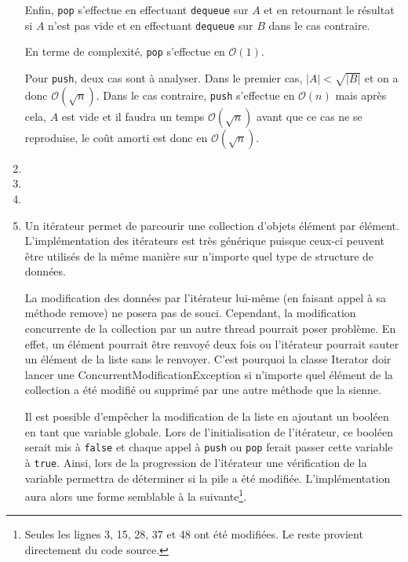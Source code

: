 \begin{enumerate}
	Enfin, \lstinline{pop}\lstinline{} s'effectue en
	effectuant \lstinline{dequeue}\lstinline{} sur $A$
	et en retournant le résultat si $A$ n'est pas vide
	et en effectuant \lstinline{dequeue}\lstinline{}
	sur $B$ dans le cas contraire.
	
	En terme de complexité,
	\lstinline{pop}\lstinline{} s'effectue en
	$\mathcal{O}(1)$.
	
	Pour \lstinline{push}\lstinline{}, deux cas sont
	à analyser. Dans le premier cas,
	$|A| < \sqrt{|B|}$ et on a donc
	$\mathcal{O}(\sqrt{n})$. Dans le cas contraire,
	\lstinline{push}\lstinline{} s'effectue en
	$\mathcal{O}(n)$ mais après cela, $A$ est vide et
	il faudra un temps $\mathcal{O}(\sqrt{n})$ avant
	que ce cas ne se reproduise, le coût amorti est
	donc en $\mathcal{O}(\sqrt{n})$.
	\item
	\item
	\item
	\item Un itérateur permet de parcourir une collection
        d'objets élément par élément. L'implémentation des
        itérateurs est très générique puisque ceux-ci peuvent
        être utilisés de la même manière sur n'importe quel
        type de structure de données.
	
	La modification des données par l'itérateur lui-même
        (en faisant appel à sa méthode remove) ne posera pas
        de souci. Cependant, la modification concurrente de
        la collection par un autre thread pourrait poser problème.
        En effet, un élément pourrait être renvoyé deux fois ou
        l'itérateur pourrait sauter un élément de la liste sans
        le renvoyer. C'est pourquoi la classe Iterator doir lancer
        une ConcurrentModificationException si n'importe quel élément
        de la collection a été modifié ou supprimé par une autre
        méthode que la sienne.\cite{iter-openclass}
	 
	Il est possible d'empêcher la modification de la liste en
        ajoutant un booléen en tant que variable globale. Lors de
        l'initialisation de l'itérateur, ce booléen serait mis à
        \lstinline{false}\lstinline{} et chaque appel à
        \lstinline{push}\lstinline{} ou \lstinline{pop}\lstinline{}
        ferait passer cette variable à \lstinline{true}\lstinline{}.
        Ainsi, lors de la progression de l'itérateur une vérification
        de la variable permettra de déterminer si la pile a été modifiée.
        L'implémentation aura alors une forme semblable à la
        suivante\footnote{Seules les lignes 3, 15, 28, 37 et 48 ont
        été modifiées. Le reste provient directement du code source.}.\\
	 

\end{enumerate}
